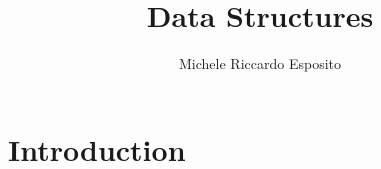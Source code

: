 \documentclass[a4paper]{report}
\begin{document}
\title{Data Structures}
\author{Michele Riccardo Esposito}
\maketitle

\setcounter{page}{2}
\tableofcontents


\chapter{Introduction}

\end{document}
